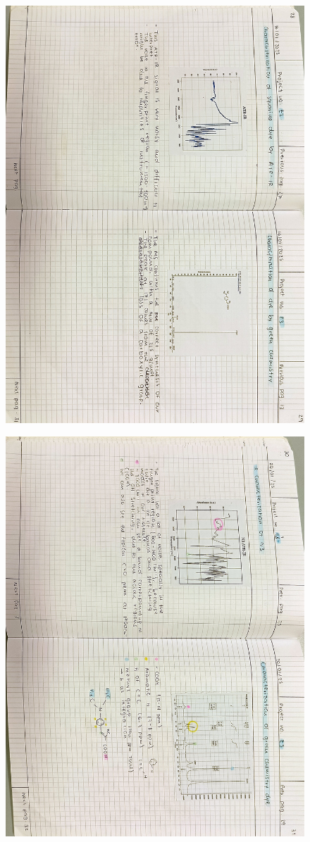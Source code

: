 \begin{figure}[H]
	\centering
	\includegraphics[width=0.6\linewidth, angle=90]{../images/compressed/IMG20250123173038.jpg}
\end{figure}
\begin{figure}[H]
	\centering
	\includegraphics[width=0.6\linewidth, angle=90]{../images/compressed/IMG20250123173043.jpg}
\end{figure}
